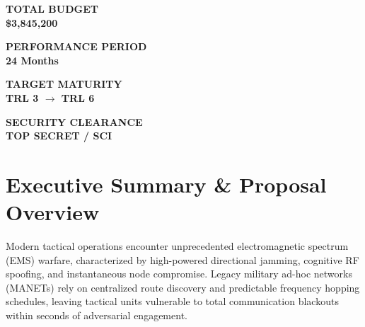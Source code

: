 \documentclass[10pt,a4paper]{article}
\begin{document}
\noindent
\begin{minipage}[t]{0.235\linewidth}
  \begin{tcolorbox}[metricbox]
    {\scriptsize\bfseries\color{SlateDark} TOTAL BUDGET}\\[2pt]
    {\large\bfseries\color{NavyPrimary} \$3,845,200}
  \end{tcolorbox}
\end{minipage}%
\hfill
\begin{minipage}[t]{0.235\linewidth}
  \begin{tcolorbox}[metricbox]
    {\scriptsize\bfseries\color{SlateDark} PERFORMANCE PERIOD}\\[2pt]
    {\large\bfseries\color{TealSecondary} 24 Months}
  \end{tcolorbox}
\end{minipage}%
\hfill
\begin{minipage}[t]{0.235\linewidth}
  \begin{tcolorbox}[metricbox]
    {\scriptsize\bfseries\color{SlateDark} TARGET MATURITY}\\[2pt]
    {\large\bfseries\color{NavyPrimary} TRL 3 $\rightarrow$ TRL 6}
  \end{tcolorbox}
\end{minipage}%
\hfill
\begin{minipage}[t]{0.235\linewidth}
  \begin{tcolorbox}[metricbox]
    {\scriptsize\bfseries\color{SlateDark} SECURITY CLEARANCE}\\[2pt]
    {\large\bfseries\color{AmberAccent} TOP SECRET / SCI}
  \end{tcolorbox}
\end{minipage}

\vspace{6pt}

\section{Executive Summary \& Proposal Overview}

Modern tactical operations encounter unprecedented electromagnetic spectrum (EMS) warfare, characterized by high-powered directional jamming, cognitive RF spoofing, and instantaneous node compromise. Legacy military ad-hoc networks (MANETs) rely on centralized route discovery and predictable frequency hopping schedules, leaving tactical units vulnerable to total communication blackouts within seconds of adversarial engagement.
\end{document}
